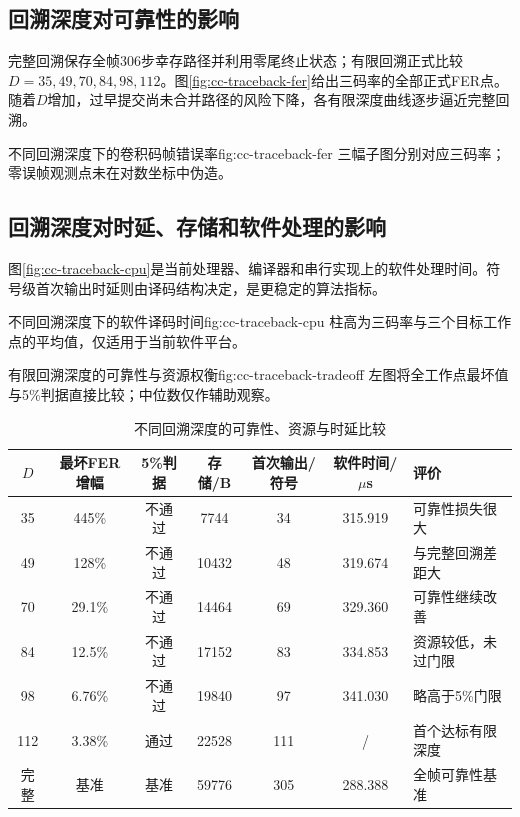 \subsection{回溯深度对可靠性的影响}

完整回溯保存全帧306步幸存路径并利用零尾终止状态；有限回溯正式比较$D=35,49,70,84,98,112$。图\ref{fig:cc-traceback-fer}给出三码率的全部正式FER点。随着$D$增加，过早提交尚未合并路径的风险下降，各有限深度曲线逐步逼近完整回溯。

  {不同回溯深度下的卷积码帧错误率}{fig:cc-traceback-fer}
  {三幅子图分别对应三码率；零误帧观测点未在对数坐标中伪造。}

\subsection{回溯深度对时延、存储和软件处理的影响}

图\ref{fig:cc-traceback-cpu}是当前处理器、编译器和串行实现上的软件处理时间。符号级首次输出时延则由译码结构决定，是更稳定的算法指标。

  {不同回溯深度下的软件译码时间}{fig:cc-traceback-cpu}
  {柱高为三码率与三个目标工作点的平均值，仅适用于当前软件平台。}

  {有限回溯深度的可靠性与资源权衡}{fig:cc-traceback-tradeoff}
  {左图将全工作点最坏值与5\%判据直接比较；中位数仅作辅助观察。}

\begin{table}[htbp]
  \centering
  \scriptsize
  \caption{不同回溯深度的可靠性、资源与时延比较}
  \label{tab:cc-traceback-results}
  \begin{tabular}{c c c c c c p{}}
    \toprule
    $D$ & 最坏FER增幅 & 5\%判据 & 存储/B & 首次输出/符号 & 软件时间/$\mu$s & 评价 \\
    \midrule
    35  & 445\% & 不通过 & 7744  & 34  & 315.919 & 可靠性损失很大 \\
    49  & 128\% & 不通过 & 10432 & 48  & 319.674 & 与完整回溯差距大 \\
    70  & 29.1\% & 不通过 & 14464 & 69  & 329.360 & 可靠性继续改善 \\
    84  & 12.5\% & 不通过 & 17152 & 83  & 334.853 & 资源较低，未过门限 \\
    98  & 6.76\% & 不通过 & 19840 & 97  & 341.030 & 略高于5\%门限 \\
    112 & 3.38\% & 通过   & 22528 & 111 &    /    &首个达标有限深度 \\
    完整 & 基准 & 基准 & 59776 & 305 & 288.388 & 全帧可靠性基准 \\
    \bottomrule
  \end{tabular}
\end{table}

